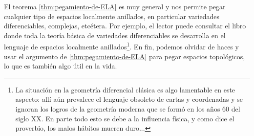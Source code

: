 \documentclass{article}
\numberwithin{equation}{section}
\theoremstyle{definition}
\begin{document}
El teorema \ref{thm:pegamiento-de-ELA} es muy general y nos permite pegar
cualquier tipo de espacios localmente anillados, en particular variedades
diferenciables, complejas, etcétera. Por ejemplo, el lector puede consultar
el libro \cite{Wedhorn-Manifolds} donde toda la teoría básica de variedades
diferenciables se desarrolla en el lenguaje de espacios localmente
anillados\footnote{La situación en la geometría diferencial clásica es algo
  lamentable en este aspecto: allí aún prevalece el lenguaje obsoleto de cartas
  y coordenadas y se ignoran los logros de la geometría moderna que se formó en
  los años 60 del siglo XX. En parte todo esto se debe a la influencia física, y
  como dice el proverbio, los malos hábitos mueren duro...}. En fin, podemos
olvidar de haces y usar el argumento de \ref{thm:pegamiento-de-ELA} para pegar
espacios topológicos, lo que es también algo útil en la vida.
\end{document}
